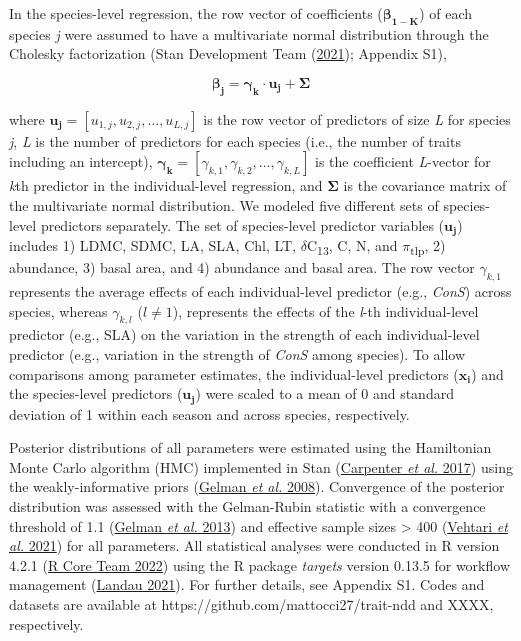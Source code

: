 \documentclass[
  12pt,
  letterpaper,
  DIV=11,
  numbers=noendperiod]{scrartcl}
\begin{document}
In the species-level regression, the row vector of coefficients
(\(\boldsymbol{\beta_{1-K}}\)) of each species \emph{j} were assumed to
have a multivariate normal distribution through the Cholesky
factorization (Stan Development Team
(\protect\hyperlink{ref-StanDevelopmentTeam2021}{2021}); Appendix S1),

\[
\boldsymbol{\beta_j} = \boldsymbol{\gamma_k} \cdot \boldsymbol{u_j} + \boldsymbol{\Sigma}
\]

where
\(\boldsymbol{u_{j}} = \left[u_{1,j}, u_{2,j}, \ldots, u_{L,j} \right]\)
is the row vector of predictors of size \emph{L} for species \emph{j},
\emph{L} is the number of predictors for each species (i.e., the number
of traits including an intercept),
\(\boldsymbol{\gamma_k} = \left[\gamma_{k,1}, \gamma_{k,2}, \ldots, \gamma_{k,L} \right]\)
is the coefficient \emph{L}-vector for \emph{k}th predictor in the
individual-level regression, and \(\boldsymbol{\Sigma}\) is the
covariance matrix of the multivariate normal distribution. We modeled
five different sets of species-level predictors separately. The set of
species-level predictor variables (\(\boldsymbol{u_j}\)) includes 1)
LDMC, SDMC, LA, SLA, Chl, LT, \(\delta\)C\textsubscript{13}, C, N, and
\(\pi\)\textsubscript{tlp}, 2) abundance, 3) basal area, and 4)
abundance and basal area. The row vector \(\gamma_{k,1}\) represents the
average effects of each individual-level predictor (e.g., \emph{ConS})
across species, whereas \(\gamma_{k, l}\) (\(l \ne 1\)), represents the
effects of the \emph{l}-th individual-level predictor (e.g., SLA) on the
variation in the strength of each individual-level predictor (e.g.,
variation in the strength of \emph{ConS} among species). To allow
comparisons among parameter estimates, the individual-level predictors
(\(\boldsymbol{x_i}\)) and the species-level predictors
(\(\boldsymbol{u_j}\)) were scaled to a mean of 0 and standard deviation
of 1 within each season and across species, respectively.

Posterior distributions of all parameters were estimated using the
Hamiltonian Monte Carlo algorithm (HMC) implemented in Stan
(\protect\hyperlink{ref-Carpenter2017}{Carpenter \emph{et al.} 2017})
using the weakly-informative priors
(\protect\hyperlink{ref-Gelman2008}{Gelman \emph{et al.} 2008}).
Convergence of the posterior distribution was assessed with the
Gelman-Rubin statistic with a convergence threshold of 1.1
(\protect\hyperlink{ref-Gelman2013}{Gelman \emph{et al.} 2013}) and
effective sample sizes \textgreater{} 400
(\protect\hyperlink{ref-Vehtari2021}{Vehtari \emph{et al.} 2021}) for
all parameters. All statistical analyses were conducted in R version
4.2.1 (\protect\hyperlink{ref-RCoreTeam2022}{R Core Team 2022}) using
the R package \emph{targets} version 0.13.5 for workflow management
(\protect\hyperlink{ref-Landau2021}{Landau 2021}). For further details,
see Appendix S1. Codes and datasets are available at
https://github.com/mattocci27/trait-ndd and XXXX, respectively.
\end{document}
